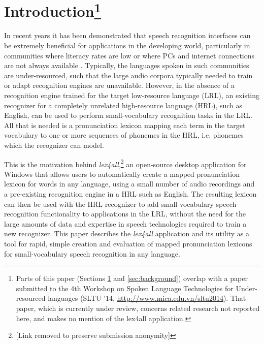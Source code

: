 \documentclass[11pt]{article}
\begin{document}
\section{Introduction\footnote{Parts of this paper (Sections \ref{sec:intro} and \ref{sec:background}) overlap with a paper submitted to the 4th Workshop on Spoken Language Technologies for Under-resourced languages (SLTU '14, \url{http://www.mica.edu.vn/sltu2014}). That paper, which is currently under review, concerns related research not reported here, and makes no mention of the lex4all application.}}
\label{sec:intro}

In recent years it has been demonstrated that speech recognition interfaces can be extremely beneficial for applications in the developing world, particularly in communities where literacy rates are low or where PCs and internet connections are not always available \cite{case4st4d,bali13,Sherwani09}. 
Typically, the languages spoken in such communities are under-resourced, such that the large audio corpora typically needed to train or adapt recognition engines are unavailable.
However, in the absence of a recognition engine trained for the target low-resource language (LRL), an existing recognizer for a completely unrelated high-resource language (HRL), such as English, can be used to perform small-vocabulary recognition tasks in the LRL. 
All that is needed is a pronunciation lexicon mapping each term in the target vocabulary to one or more sequences of phonemes in the HRL, i.e. phonemes which the recognizer can model. 

This is the motivation behind \textit{lex4all},\footnote{[Link removed to preserve submission anonymity]} an open-source desktop application for Windows that allows users to automatically create a mapped pronunciation lexicon for words in any language, using a small number of audio recordings and a pre-existing recognition engine in a HRL such as English. The resulting lexicon can then be used with the HRL recognizer to add small-vocabulary speech recognition functionality to applications in the LRL, without the need for the large amounts of data and expertise in speech technologies required to train a new recognizer. This paper describes the \textit{lex4all} application and its utility as a tool for rapid, simple creation and evaluation of mapped pronunciation lexicons for small-vocabulary speech recognition in any language.
\end{document}
